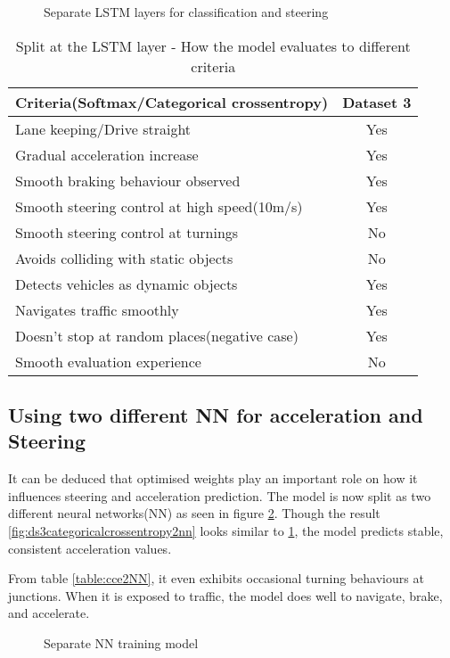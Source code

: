 \begin{figure}[!ht]
	\centering
    \def\svgwidth{0.8\textwidth}
    \caption{Separate LSTM layers for classification and steering}
    \label{fig:ds3categoricalcrossentropylstm}
\end{figure}
\begin{table}[!ht]
    \centering
\begin{tabular}{lc}
    \toprule
    Criteria(Softmax/Categorical crossentropy)  & Dataset 3 \\\midrule
    Lane keeping/Drive straight  & Yes  \\
    Gradual acceleration increase  & Yes\\
    Smooth braking behaviour observed & Yes \\
    Smooth steering control at high speed(10m/s) & Yes \\
    Smooth steering control at turnings & No\\
    Avoids colliding with static objects & No \\
    Detects vehicles as dynamic objects & Yes \\
    Navigates traffic smoothly & Yes\\
    Doesn't stop at random places(negative case) & Yes \\
    Smooth evaluation experience & No \\\bottomrule

\end{tabular}
\caption{Split at the LSTM layer - How the model evaluates to different criteria}
\label{table:cceLSTM}
\end{table}

\subsection{Using two different NN for acceleration and
Steering}
It can be deduced that optimised weights play an important role on how it influences
steering and acceleration prediction. The model is now split as two different neural
networks(NN) as seen in figure \ref{fig:steeringnnsplit}. Though the result
\ref{fig:ds3categoricalcrossentropy2nn} looks similar to
\ref{fig:ds3categoricalcrossentropylstm}, the model predicts stable, consistent
acceleration values.

From table \ref{table:cce2NN}, it even exhibits occasional turning behaviours at junctions. When it
is exposed to traffic, the model does well to navigate, brake, and accelerate.
\begin{figure}[!ht]
	\centering
    \def\svgwidth{0.5\textwidth}
    \caption{Separate NN training model}
    \label{fig:steeringnnsplit}
\end{figure}

